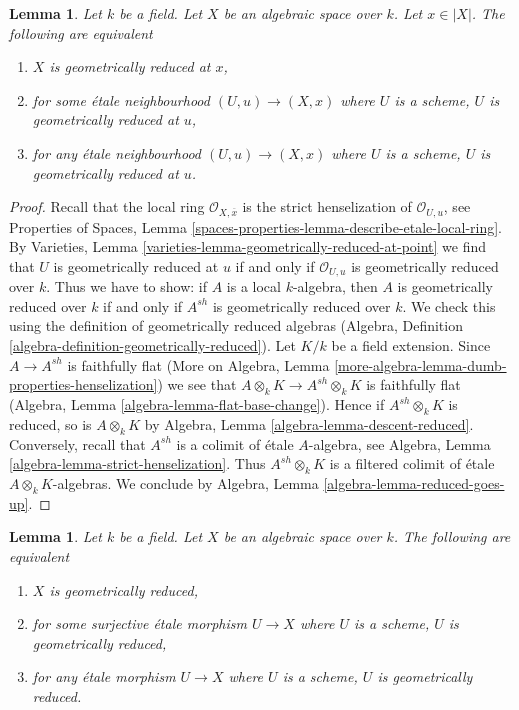 \documentclass{stacks-project}
\theoremstyle{plain}
\newtheorem{lemma}[subsection]{Lemma}
\theoremstyle{definition}
\theoremstyle{remark}
\numberwithin{equation}{subsection}
\begin{document}
\begin{lemma}
\label{lemma-geometrically-reduced-at-point}
Let $k$ be a field. Let $X$ be an algebraic space over $k$.
Let $x \in |X|$. The following are equivalent
\begin{enumerate}
\item $X$ is geometrically reduced at $x$,
\item for some \'etale neighbourhood $(U, u) \to (X, x)$
where $U$ is a scheme, $U$ is geometrically reduced at $u$,
\item for any \'etale neighbourhood $(U, u) \to (X, x)$
where $U$ is a scheme, $U$ is geometrically reduced at $u$.
\end{enumerate}
\end{lemma}

\begin{proof}
Recall that the local ring $\mathcal{O}_{X, \overline{x}}$
is the strict henselization of $\mathcal{O}_{U, u}$, see
Properties of Spaces, Lemma
\ref{spaces-properties-lemma-describe-etale-local-ring}.
By Varieties, Lemma \ref{varieties-lemma-geometrically-reduced-at-point}
we find that $U$ is geometrically reduced at $u$ if and only
if $\mathcal{O}_{U, u}$ is geometrically reduced over $k$.
Thus we have to show: if $A$ is a local $k$-algebra, then
$A$ is geometrically reduced over $k$ if and only if
$A^{sh}$ is geometrically reduced over $k$.
We check this using the definition of geometrically reduced
algebras (Algebra, Definition \ref{algebra-definition-geometrically-reduced}).
Let $K/k$ be a field extension.
Since $A \to A^{sh}$ is faithfully flat
(More on Algebra, Lemma \ref{more-algebra-lemma-dumb-properties-henselization})
we see that
$A \otimes_k K \to A^{sh} \otimes_k K$ is faithfully flat
(Algebra, Lemma \ref{algebra-lemma-flat-base-change}).
Hence if $A^{sh} \otimes_k K$ is reduced, so is
$A \otimes_k K$ by Algebra, Lemma \ref{algebra-lemma-descent-reduced}.
Conversely, recall that $A^{sh}$ is a colimit of
\'etale $A$-algebra, see
Algebra, Lemma \ref{algebra-lemma-strict-henselization}.
Thus $A^{sh} \otimes_k K$ is a filtered
colimit of \'etale $A \otimes_k K$-algebras.
We conclude by Algebra, Lemma \ref{algebra-lemma-reduced-goes-up}.
\end{proof}

\begin{lemma}
\label{lemma-geometrically-reduced}
Let $k$ be a field. Let $X$ be an algebraic space over $k$.
The following are equivalent
\begin{enumerate}
\item $X$ is geometrically reduced,
\item for some surjective \'etale morphism $U \to X$ where $U$
is a scheme, $U$ is geometrically reduced,
\item for any \'etale morphism $U \to X$
where $U$ is a scheme, $U$ is geometrically reduced.
\end{enumerate}
\end{lemma}
\end{document}

